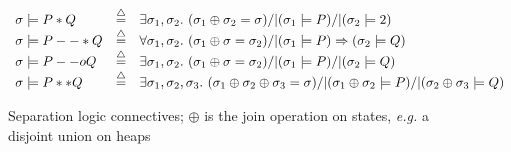 \begin{figure}
{\footnotesize
\[
\begin{array}{lcl}
\sigma |= P * Q & \mathbin{\stackrel{\triangle}{=}} & \exists \sigma_1, \sigma_2.~ (\sigma_1 \oplus \sigma_2 = \sigma) /| (\sigma_1 |= P) /| (\sigma_2 |= 2)\\
\sigma |= P --* Q & \mathbin{\stackrel{\triangle}{=}} & \forall \sigma_1, \sigma_2.~ (\sigma_1 \oplus \sigma = \sigma_2) /| (\sigma_1 |= P) => (\sigma_2 |= Q) \\
\sigma |= P --o Q & \mathbin{\stackrel{\triangle}{=}} & \exists \sigma_1, \sigma_2.~ (\sigma_1 \oplus \sigma = \sigma_2) /| (\sigma_1 |= P) /| (\sigma_2 |= Q) \\
\sigma |= P ** Q & \mathbin{\stackrel{\triangle}{=}} & \exists \sigma_1, \sigma_2, \sigma_3.~ (\sigma_1 \oplus \sigma_2 \oplus \sigma_3 = \sigma) /| (\sigma_1 \oplus \sigma_2 |= P) /| (\sigma_2 \oplus \sigma_3 |= Q)
\end{array}
\]
}
\vspace{-1em}
\caption{Separation logic connectives; $\oplus$ is the join operation on states, \emph{e.g.} a disjoint union on heaps}
\label{fig:seplogsem}
\vspace*{-1em}
\end{figure} 